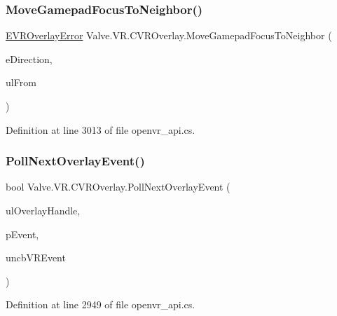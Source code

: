 \subsubsection{\texorpdfstring{MoveGamepadFocusToNeighbor()}{MoveGamepadFocusToNeighbor()}}
{\footnotesize\ttfamily \mbox{\hyperlink{namespace_valve_1_1_v_r_aaee5c5144f42b7969d45b854f51b0c18}{E\+V\+R\+Overlay\+Error}} Valve.\+V\+R.\+C\+V\+R\+Overlay.\+Move\+Gamepad\+Focus\+To\+Neighbor (\begin{DoxyParamCaption}\item[{\mbox{\hyperlink{namespace_valve_1_1_v_r_ad0398c1325c370eb3a4796d89610b868}{E\+Overlay\+Direction}}}]{e\+Direction,  }\item[{ulong}]{ul\+From }\end{DoxyParamCaption})}



Definition at line 3013 of file openvr\+\_\+api.\+cs.

\mbox{\label{class_valve_1_1_v_r_1_1_c_v_r_overlay_ac2d2b7c13bc798f3aa6518a588270899}} 
\subsubsection{\texorpdfstring{PollNextOverlayEvent()}{PollNextOverlayEvent()}}
{\footnotesize\ttfamily bool Valve.\+V\+R.\+C\+V\+R\+Overlay.\+Poll\+Next\+Overlay\+Event (\begin{DoxyParamCaption}\item[{ulong}]{ul\+Overlay\+Handle,  }\item[{ref \mbox{\hyperlink{struct_valve_1_1_v_r_1_1_v_r_event__t}{V\+R\+Event\+\_\+t}}}]{p\+Event,  }\item[{uint}]{uncb\+V\+R\+Event }\end{DoxyParamCaption})}



Definition at line 2949 of file openvr\+\_\+api.\+cs.

\mbox{\label{class_valve_1_1_v_r_1_1_c_v_r_overlay_aea1b0d3f05c135c46c04dd0f68c53e5c}} 
